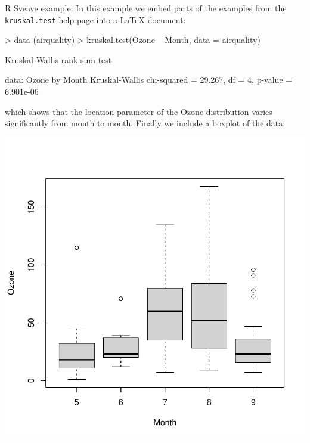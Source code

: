 \documentclass[a4paper]{article}
\begin{document}


R Sveave example:
In this example we embed parts of the examples from the
\texttt{kruskal.test} help page into a LaTeX document:

\begin{Schunk}
\begin{Sinput}
> data (airquality)
> kruskal.test(Ozone ~ Month, data = airquality)
\end{Sinput}
\begin{Soutput}
	Kruskal-Wallis rank sum test

data:  Ozone by Month
Kruskal-Wallis chi-squared = 29.267, df = 4, p-value = 6.901e-06
\end{Soutput}
\end{Schunk}

which shows that the location parameter of the Ozone
distribution varies significantly from month to month.
Finally we include a boxplot of the data:

\begin{center}
\includegraphics{r-sveave-example-002}
\end{center}
\end{document}
